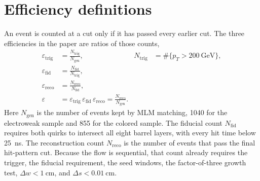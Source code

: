 \documentclass[11pt,a4paper]{article}
\begin{document}
\section{Efficiency definitions}
An event is counted at a cut only if it has passed every earlier cut.
The three efficiencies in the paper are ratios of those counts,
\begin{align}
\varepsilon_{\mathrm{trig}}
  &= \frac{N_{\mathrm{trig}}}{N_{\mathrm{gen}}},
  &
  N_{\mathrm{trig}}
  &= \#\{p_T > \SI{200}{\GeV}\},
  \label{eq:trig}
  \\
\varepsilon_{\mathrm{fid}}
  &= \frac{N_{\mathrm{fid}}}{N_{\mathrm{trig}}},
  \label{eq:fid}
  \\
\varepsilon_{\mathrm{reco}}
  &= \frac{N_{\mathrm{reco}}}{N_{\mathrm{fid}}},
  \label{eq:reco}
  \\
\varepsilon
  &= \varepsilon_{\mathrm{trig}}\,
     \varepsilon_{\mathrm{fid}}\,
     \varepsilon_{\mathrm{reco}}
   = \frac{N_{\mathrm{reco}}}{N_{\mathrm{gen}}}.
  \label{eq:total}
\end{align}
Here \(N_{\mathrm{gen}}\) is the number of events kept by MLM matching, 1040 for the electroweak sample and 855 for the colored sample.
The fiducial count \(N_{\mathrm{fid}}\) requires both quirks to intersect all eight barrel layers, with every hit time below \SI{25}{\ns}.
The reconstruction count \(N_{\mathrm{reco}}\) is the number of events that pass the final hit-pattern cut.
Because the flow is sequential, that count already requires the trigger, the fiducial requirement, the seed windows, the factor-of-three growth test, \(\Delta w < \SI{1}{\cm}\), and \(\Delta s < \SI{0.01}{\cm}\).
\end{document}
